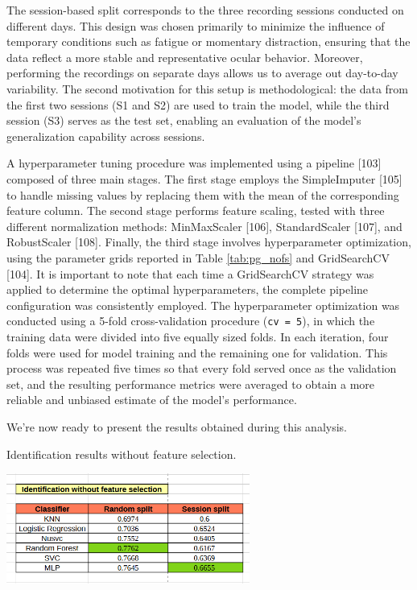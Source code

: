 \documentclass[12pt]{report}
\begin{document}
The session-based split corresponds to the three recording sessions conducted on different days. 
This design was chosen primarily to minimize the influence of temporary conditions such as fatigue or momentary distraction, ensuring that the data reflect a more stable and representative ocular behavior. 
Moreover, performing the recordings on separate days allows us to average out day-to-day variability. 
The second motivation for this setup is methodological: the data from the first two sessions (S1 and S2) are used to train the model, while the third session (S3) serves as the test set, enabling an evaluation of the model's generalization capability across sessions.

A hyperparameter tuning procedure was implemented using a pipeline [103] composed of three main stages.
The first stage employs the SimpleImputer [105] to handle missing values by replacing them with the mean of the corresponding feature column. 
The second stage performs feature scaling, tested with three different normalization methods: MinMaxScaler [106], StandardScaler [107], and RobustScaler [108]. 
Finally, the third stage involves hyperparameter optimization, using the parameter grids reported in Table \ref{tab:pg_nofs} and GridSearchCV [104]. 
It is important to note that each time a GridSearchCV strategy was applied to determine the optimal hyperparameters, the complete pipeline configuration was consistently employed. 
The hyperparameter optimization was conducted using a 5-fold cross-validation procedure (\texttt{cv = 5}), in which the training data were divided into five equally sized folds. 
In each iteration, four folds were used for model training and the remaining one for validation. 
This process was repeated five times so that every fold served once as the validation set, and the resulting performance metrics were averaged to obtain a more reliable and unbiased estimate of the model's performance.

We're now ready to present the results obtained during this analysis.

\begin{table}[ht]
    \centering
    \caption{Identification results without feature selection.} %
    \includegraphics[width=0.6\textwidth]{Images/Results/Identification/nofs.png}
    \label{tab:id_nofs}
\end{table}
\end{document}
